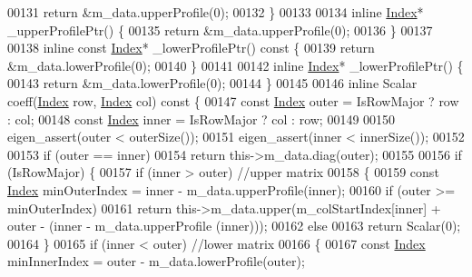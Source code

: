 \begin{DoxyCode}
00131         \textcolor{keywordflow}{return} &m\_data.upperProfile(0);
00132     \}
00133 
00134     \textcolor{keyword}{inline} \hyperlink{group___core___module_a554f30542cc2316add4b1ea0a492ff02}{Index}* \_upperProfilePtr() \{
00135         \textcolor{keywordflow}{return} &m\_data.upperProfile(0);
00136     \}
00137 
00138     \textcolor{keyword}{inline} \textcolor{keyword}{const} \hyperlink{group___core___module_a554f30542cc2316add4b1ea0a492ff02}{Index}* \_lowerProfilePtr()\textcolor{keyword}{ const }\{
00139         \textcolor{keywordflow}{return} &m\_data.lowerProfile(0);
00140     \}
00141 
00142     \textcolor{keyword}{inline} \hyperlink{group___core___module_a554f30542cc2316add4b1ea0a492ff02}{Index}* \_lowerProfilePtr() \{
00143         \textcolor{keywordflow}{return} &m\_data.lowerProfile(0);
00144     \}
00145 
00146     \textcolor{keyword}{inline} Scalar coeff(\hyperlink{group___core___module_a554f30542cc2316add4b1ea0a492ff02}{Index} row, \hyperlink{group___core___module_a554f30542cc2316add4b1ea0a492ff02}{Index} col)\textcolor{keyword}{ const }\{
00147         \textcolor{keyword}{const} \hyperlink{group___core___module_a554f30542cc2316add4b1ea0a492ff02}{Index} outer = IsRowMajor ? row : col;
00148         \textcolor{keyword}{const} \hyperlink{group___core___module_a554f30542cc2316add4b1ea0a492ff02}{Index} inner = IsRowMajor ? col : row;
00149 
00150         eigen\_assert(outer < outerSize());
00151         eigen\_assert(inner < innerSize());
00152 
00153         \textcolor{keywordflow}{if} (outer == inner)
00154             \textcolor{keywordflow}{return} this->m\_data.diag(outer);
00155 
00156         \textcolor{keywordflow}{if} (IsRowMajor) \{
00157             \textcolor{keywordflow}{if} (inner > outer) \textcolor{comment}{//upper matrix}
00158             \{
00159                 \textcolor{keyword}{const} \hyperlink{group___core___module_a554f30542cc2316add4b1ea0a492ff02}{Index} minOuterIndex = inner - m\_data.upperProfile(inner);
00160                 \textcolor{keywordflow}{if} (outer >= minOuterIndex)
00161                     \textcolor{keywordflow}{return} this->m\_data.upper(m\_colStartIndex[inner] + outer - (inner - m\_data.upperProfile
      (inner)));
00162                 \textcolor{keywordflow}{else}
00163                     \textcolor{keywordflow}{return} Scalar(0);
00164             \}
00165             \textcolor{keywordflow}{if} (inner < outer) \textcolor{comment}{//lower matrix}
00166             \{
00167                 \textcolor{keyword}{const} \hyperlink{group___core___module_a554f30542cc2316add4b1ea0a492ff02}{Index} minInnerIndex = outer - m\_data.lowerProfile(outer);

\end{DoxyCode}
